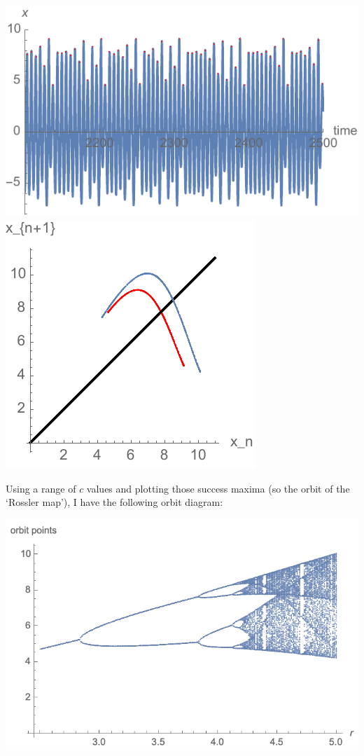 \documentclass[12pt,letterpaper,noanswers]{exam}
\begin{document}
\begin{questions}
\begin{parts}
\includegraphics[scale=0.8]{img/191108-C27p5d.pdf}
\includegraphics[scale=0.8]{img/191108-C27p5c.pdf}

Using a range of $c$ values and plotting those success maxima (so the orbit of the `Rossler map'), I have the following orbit diagram:

\includegraphics[scale=0.8]{img/191108-C27p5b.png}


\end{parts}
\end{questions}
\end{document}
